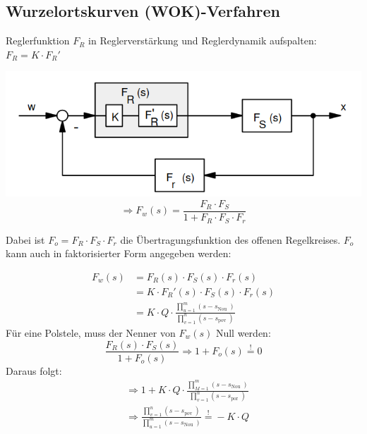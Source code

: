 \documentclass[10pt,a4paper]{article}
\begin{document}
  \subsection{Wurzelortskurven (WOK)-Verfahren}
  \begin{mdframed}[style=exercise]
      Reglerfunktion $F_R$ in Reglerverstärkung und Reglerdynamik aufspalten:
      $F_R =K \cdot F_R ' $\\
  \end{mdframed}
  \includegraphics[width=.45\textwidth]{Figures/WOKkreis.png}
  \[
  \Rightarrow F_w (s)= \dfrac {F_R \cdot F_S} {1+F_R \cdot F_S \cdot F_r}\]
       \begin{mdframed}[style=exercise]

     Dabei ist $F_o = F_R \cdot F_S \cdot F_r$ die Übertragungsfunktion des offenen Regelkreises.
    $F_o$ kann auch in faktorisierter Form angegeben werden:
  \end{mdframed}
  \begin{align*}
  F_w (s)&= F_R (s) \cdot F_S (s) \cdot F_r (s)\\
        &=K \cdot F_R '(s) \cdot F_S (s) \cdot F_r (s)\\
        &=K \cdot Q \cdot \frac{\prod_{u=1}^{m}\left(s-s_{\text {Nou }}\right)}{\prod_{v=1}^{n}\left(s-s_{\text {pov }}\right)}
  \end{align*}
  Für eine Polstele, muss der Nenner von $F_w (s)$ Null werden:
  \[ \dfrac{F_R (s) \cdot F_S (s)}{1+F_o (s)} \Rightarrow 1+F_o (s) \stackrel{!}{=}0\]
  Daraus folgt:
  \begin{align*}
      &\Rightarrow 1+ K \cdot Q \cdot \frac{\prod_{M=1}^{m}\left(s-s_{\text {Nou }}\right)}{\prod_{v=1}^{n}\left(s-s_{\text {por }}\right)}\\
      &\Rightarrow \frac{\prod_{v=1}^{n}\left(s-s_{\text {pov }}\right)}{\prod_{u=1}^{m}\left(s-s_{\text {Nou }}\right)} \stackrel{!}{=} -K \cdot Q
  \end{align*}
\end{document}
